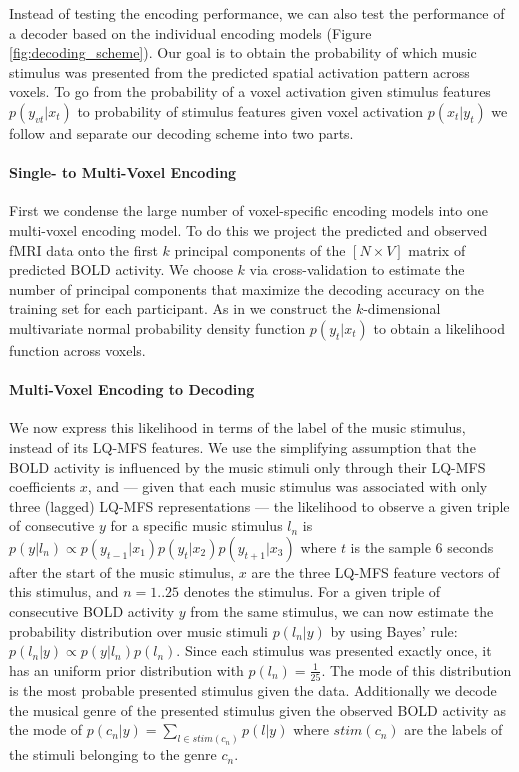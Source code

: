 Instead of testing the encoding performance, we can also test the performance of a decoder based on the individual encoding models \citep{NG11} (Figure \ref{fig:decoding_scheme}). Our goal is to obtain the probability of which music stimulus was presented from the predicted spatial activation pattern across voxels. To go from the probability of a voxel activation given stimulus features $p(y_{vt}|x_{t})$ to probability of stimulus features given voxel activation $p(x_{t}|y_{t})$ we follow \citet{NG09} and separate our decoding scheme into two parts. 

\paragraph{Single- to Multi-Voxel Encoding}

First we condense the large number of voxel-specific encoding models into one multi-voxel encoding model.  To do this we project the predicted and observed f{MRI} data onto the first $k$ principal components of the $[N\times V]$ matrix of predicted BOLD activity. We choose $k$ via cross-validation to estimate the number of principal components that maximize the decoding accuracy on the training set for each participant. As in \citet{NG09} we construct the $k$-dimensional multivariate normal probability density function $p(y_{t}|x_{t})$ to obtain a likelihood function across voxels. 

\paragraph{Multi-Voxel Encoding to Decoding}

We now express this likelihood in terms of the label of the music stimulus, instead of its LQ-MFS features. We use the simplifying assumption that the BOLD activity is influenced by the music stimuli only through their LQ-MFS coefficients $x$, and --- given that each music stimulus was associated with only three (lagged) LQ-MFS representations --- the likelihood to observe a given triple of consecutive $y$ for a specific music stimulus $l_{n}$ is $p(y|l_{n}) \propto p(y_{t-1}|x_{1})p(y_{t}|x_{2})p(y_{t+1}|x_{3})$ where $t$ is the sample 6 seconds after the start of the music stimulus, $x$ are the three LQ-MFS feature vectors of this stimulus, and $n=1..25$ denotes the stimulus. For a given triple of consecutive BOLD activity $y$ from the same stimulus, we can now estimate the probability distribution over music stimuli $p(l_{n}|y)$  by using Bayes' rule: $p(l_{n}|y) \propto p(y|l_{n})p(l_{n})$. Since each stimulus was presented exactly once, it has an uniform prior distribution with $p(l_{n})=\frac{1}{25}$. The mode of this distribution is the most probable presented stimulus given the data. 
Additionally we decode the musical genre of the presented stimulus given the observed BOLD activity as the mode of $p(c_{n}|y) = \sum\nolimits_{l \in  stim(c_{n})} p(l|y)$ where $stim(c_{n})$ are the labels of the stimuli   belonging to the genre $c_{n}$. 

